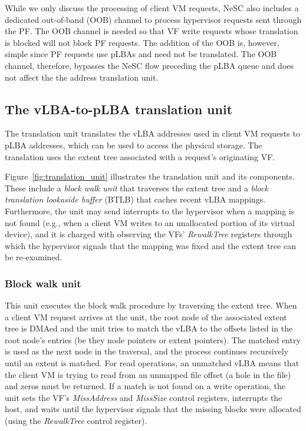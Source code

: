 While we only discuss the processing of client VM requests, NeSC also includes a dedicated out-of-band (OOB) channel to process hypervisor requests sent through the PF. The OOB channel is needed so that VF write requests whose translation is blocked will not block PF requests. The addition of the OOB is, however, simple since PF requests use pLBAs and need not be translated. The OOB channel, therefore, bypasses the NeSC flow preceding the pLBA queue and does not affect the the address translation unit.

\subsection{The vLBA-to-pLBA translation unit}

The translation unit translates the vLBA addresses used in client VM requests to pLBA addresses, which can be used to access the physical storage. The translation uses the extent tree associated with a request's originating VF.

Figure~\ref{fig:translation_unit} illustrates the translation unit and its components. These include a \emph{block walk unit} that traverses the extent tree and a \emph{block translation lookaside buffer} (BTLB) that caches recent vLBA mappings. Furthermore, the unit may send interrupts to the hypervisor when a mapping is not found (e.g., when a client VM writes to an unallocated portion of its virtual device), and it is charged with observing the VFs' \emph{RewalkTree} registers through which the hypervisor signals that the mapping was fixed and the extent tree can be re-examined.

\subsubsection*{Block walk unit}
This unit executes the block walk procedure by traversing the extent tree.
When a client VM request arrives at the unit, the root node of the associated extent tree is DMAed and the unit tries to match the vLBA to the offsets listed in the root node's entries (be they node pointers or extent pointers). The matched entry is used as the next node in the traversal, and the process continues recursively until an extent is matched. For read operations, an unmatched vLBA means that the client VM is trying to read from an unmapped file offset (a hole in the file) and zeros must be returned. If a match is not found on a write operation, the unit sets the VF's \emph{MissAddress} and \emph{MissSize} control registers, interrupts the host, and waits until the hypervisor signals that the missing blocks were allocated (using the \emph{RewalkTree} control register).

